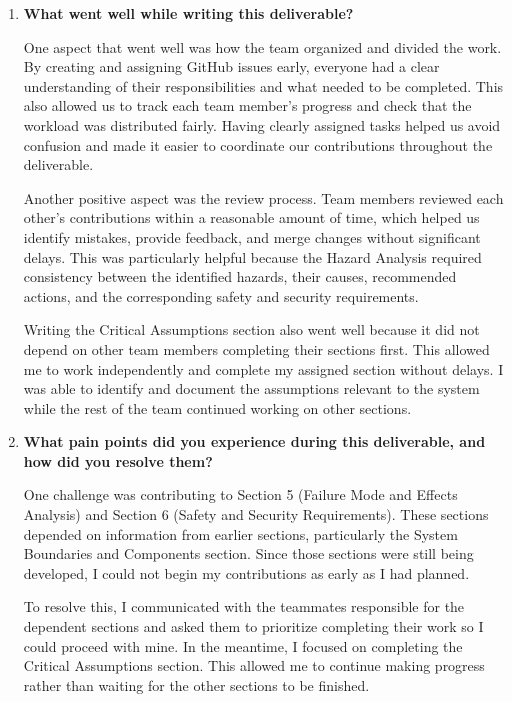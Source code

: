 \documentclass{article}
\newcounter{hazard}
\begin{document}
\begin{enumerate}
    \item \textbf{What went well while writing this deliverable?}

      One aspect that went well was how the team organized
      and divided the work. By creating and assigning GitHub
      issues early, everyone had a clear understanding of
      their responsibilities and what needed to be completed.
      This also allowed us to track each team member's
      progress and check that the workload was distributed
      fairly. Having clearly assigned tasks helped us avoid
      confusion and made it easier to coordinate our
      contributions throughout the deliverable.

      Another positive aspect was the review process.
      Team members reviewed each other's contributions
      within a reasonable amount of time, which helped
      us identify mistakes, provide feedback, and merge
      changes without significant delays. This was
      particularly helpful because the Hazard Analysis
      required consistency between the identified hazards,
      their causes, recommended actions, and the
      corresponding safety and security requirements.

      Writing the Critical Assumptions section also went
      well because it did not depend on other team members
      completing their sections first. This allowed me to
      work independently and complete my assigned section
      without delays. I was able to identify and document
      the assumptions relevant to the system while the
      rest of the team continued working on other sections.

    \item \textbf{What pain points did you experience during this deliverable,
    and how did you resolve them?}

      One challenge was contributing to Section 5
      (Failure Mode and Effects Analysis) and Section 6
      (Safety and Security Requirements). These sections
      depended on information from earlier sections,
      particularly the System Boundaries and Components
      section. Since those sections were still being
      developed, I could not begin my contributions
      as early as I had planned.

      To resolve this, I communicated with the teammates
      responsible for the dependent sections and asked
      them to prioritize completing their work so I
      could proceed with mine. In the meantime, I focused
      on completing the Critical Assumptions section.
      This allowed me to continue making progress rather
      than waiting for the other sections to be finished.


\end{enumerate}
\end{document}
